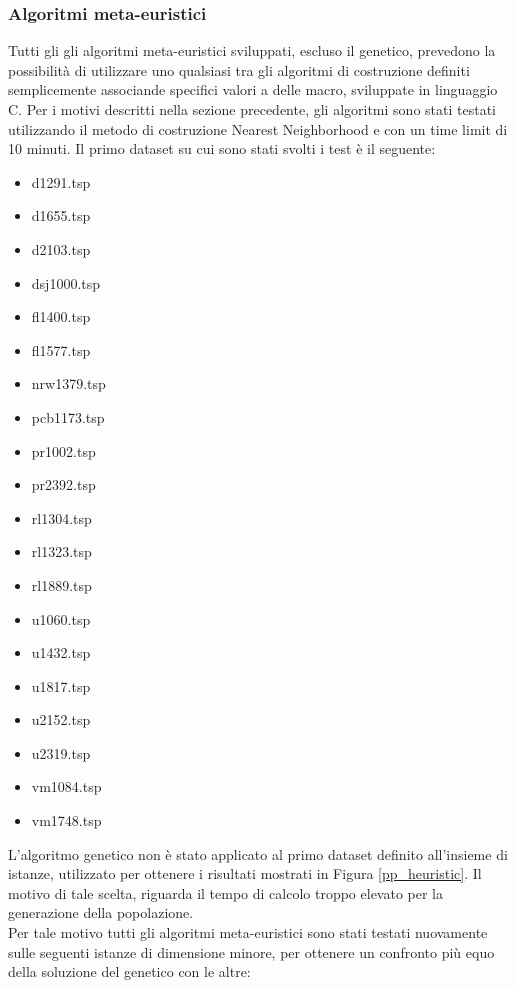 \subsubsection{Algoritmi meta-euristici}
Tutti gli gli algoritmi meta-euristici sviluppati, escluso il genetico, prevedono la possibilità di utilizzare uno qualsiasi tra gli algoritmi di costruzione definiti semplicemente associande specifici valori a delle macro, sviluppate in linguaggio C. Per i motivi descritti nella sezione precedente, gli algoritmi sono stati testati utilizzando il metodo di costruzione Nearest Neighborhood e con un time limit di 10 minuti. Il primo dataset su cui sono stati svolti i test è il seguente:
\begin{center}
\begin{multicols}{3}
\begin{itemize}
\item{d1291.tsp}
\item{d1655.tsp} 
\item{d2103.tsp} 
\item{dsj1000.tsp}
\item{fl1400.tsp} 
\item{fl1577.tsp} 
\item{nrw1379.tsp} 
\item{pcb1173.tsp} 
\item{pr1002.tsp}
\item{pr2392.tsp}
\item{rl1304.tsp}
\item{rl1323.tsp}
\item{rl1889.tsp}
\item{u1060.tsp} 
\item{u1432.tsp}
\item{u1817.tsp}
\item{u2152.tsp}
\item{u2319.tsp}
\item{vm1084.tsp}
\item{vm1748.tsp}
\end{itemize}
\end{multicols}
\end{center}
L'algoritmo genetico non è stato applicato al primo dataset definito all'insieme di istanze, utilizzato per ottenere i risultati mostrati in Figura \ref{pp_heuristic}. Il motivo di tale scelta, riguarda il tempo di calcolo troppo elevato per la generazione della popolazione.\\
Per tale motivo tutti gli algoritmi meta-euristici sono stati testati nuovamente sulle seguenti istanze di dimensione minore, per ottenere un confronto più equo della soluzione del genetico con le altre:
